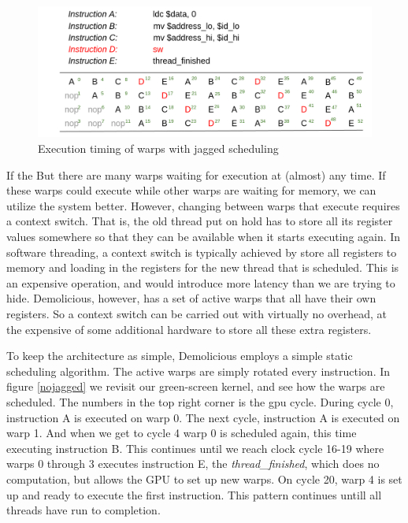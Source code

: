 \documentclass[../main/report.tex]{subfiles}
\begin{document}
\begin{figure}[htp]
\centering
\includegraphics[scale=0.23]{../gpu/diagrams/jaktstart_num.png}
\caption{Execution timing of warps with jagged scheduling}
\label{jagged}
\end{figure}

If the 
But there are many warps waiting for execution at (almost) any time. 
If these warps could execute while other warps are waiting for memory, we can utilize the system better.
However, changing between warps that execute requires a context switch. 
That is, the old thread put on hold has to store all its register values somewhere so that they can be available when it starts executing again.
In software threading, a context switch is typically achieved by store all registers to memory and loading in the registers for the new thread that is scheduled.
This is an expensive operation, and would introduce more latency than we are trying to hide.
Demolicious, however, has a set of active warps that all have their own registers.
So a context switch can be carried out with virtually no overhead, at the expensive of some additional hardware to store all these extra registers.

To keep the architecture as simple, Demolicious employs a simple static scheduling algorithm. 
The active warps are simply rotated every instruction. In figure \ref{nojagged} we revisit our green-screen kernel, and see how the warps are scheduled. 
The numbers in the top right corner is the gpu cycle. 
During cycle 0, instruction A is executed on warp 0. 
The next cycle, instruction A is executed on warp 1. 
And when we get to cycle 4 warp 0 is scheduled again, this time executing instruction B.
This continues until we reach clock cycle 16-19 where warps 0 through 3 executes instruction E, the \emph{thread\_finished}, which does no computation, but allows the GPU to set up new warps.
On cycle 20, warp 4 is set up and ready to execute the first instruction.
This pattern continues untill all threads have run to completion. 
\end{document}
